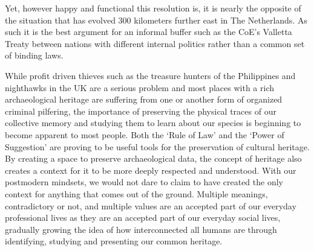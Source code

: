 Yet, however happy and functional this resolution is, it is nearly the opposite of the situation that has evolved 300 kilometers further east in The Netherlands. As such it is the best argument for an informal buffer such as the CoE’s Valletta Treaty between nations with different internal politics rather than a common set of binding laws. 

While profit driven thieves such as the treasure hunters of the Philippines and night\-hawks in the UK are a serious problem and most places with a rich archaeological heritage are suffering from one or another form of organized criminal pilfering, the importance of preserving the physical traces of our collective memory and studying them to learn about our species is beginning to become apparent to most people. Both the ‘Rule of Law’ \parencite{RA10066} and the ‘Power of Suggestion’ \parencite{Valletta_1992} are proving to be useful tools for the preservation of cultural heritage. By creating a space to preserve archaeological data, the concept of heritage also creates a context for it to be more deeply respected and understood. With our postmodern mindsets, we would not dare to claim to have created the only context for anything that comes out of the ground. Multiple meanings, contradictory or not, and multiple values are an accepted part of our everyday professional lives as they are an accepted part of our everyday social lives, gradually growing the idea of how interconnected all humans are through identifying, studying and presenting our common heritage.



\IJSRAclosing
%